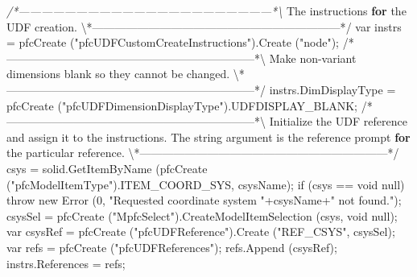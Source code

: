 \documentclass[]{article}
\newenvironment{Shaded}{}{}
\newcommand{\KeywordTok}[1]{\textcolor[rgb]{0.00,0.44,0.13}{\textbf{{#1}}}}
\newcommand{\FloatTok}[1]{\textcolor[rgb]{0.25,0.63,0.44}{{#1}}}
\newcommand{\CommentTok}[1]{\textcolor[rgb]{0.38,0.63,0.69}{\textit{{#1}}}}
\newcommand{\OtherTok}[1]{\textcolor[rgb]{0.00,0.44,0.13}{{#1}}}
\newcommand{\NormalTok}[1]{{#1}}
\begin{document}
\begin{Shaded}
\begin{Highlighting}[]
\CommentTok{/*------------------------------------------------------------------*\textbackslash{}}
  \NormalTok{The instructions }\KeywordTok{for} \NormalTok{the UDF }\OtherTok{creation}\NormalTok{.}
\NormalTok{\textbackslash{}*------------------------------------------------------------------*}\OtherTok{/  }
\OtherTok{  var instrs = }
\OtherTok{    pfcCreate }\FloatTok{(}\OtherTok{"pfcUDFCustomCreateInstructions"}\FloatTok{)}\OtherTok{.Create }\FloatTok{(}\OtherTok{"node"}\FloatTok{)}\OtherTok{;}
\OtherTok{    }
\OtherTok{/}\NormalTok{*------------------------------------------------------------------*\textbackslash{}}
  \NormalTok{Make non-variant dimensions blank so they cannot be }\OtherTok{changed}\NormalTok{.}
\NormalTok{\textbackslash{}*------------------------------------------------------------------*}\OtherTok{/  }
\OtherTok{  instrs.DimDisplayType = }
\OtherTok{    pfcCreate }\FloatTok{(}\OtherTok{"pfcUDFDimensionDisplayType"}\FloatTok{)}\OtherTok{.UDFDISPLAY_BLANK;}
\OtherTok{  }
\OtherTok{/}\NormalTok{*------------------------------------------------------------------*\textbackslash{}}
  \NormalTok{Initialize the UDF reference and assign it to the }\OtherTok{instructions}\NormalTok{.  }
  \NormalTok{The string argument is the reference prompt }\KeywordTok{for} \NormalTok{the particular }
  \OtherTok{reference}\NormalTok{.}
\NormalTok{\textbackslash{}*------------------------------------------------------------------*}\OtherTok{/       }
\OtherTok{  csys = }
\OtherTok{    solid.GetItemByName }\FloatTok{(}\OtherTok{pfcCreate }\FloatTok{(}\OtherTok{"pfcModelItemType"}\FloatTok{)}\OtherTok{.ITEM_COORD_SYS, }
\OtherTok{             csysName}\FloatTok{)}\OtherTok{;}
\OtherTok{  if }\FloatTok{(}\OtherTok{csys == void null}\FloatTok{)}
\OtherTok{    throw new Error }\FloatTok{(}\OtherTok{0, "Requested coordinate system "}\FloatTok{+}\OtherTok{csysName}\FloatTok{+}\OtherTok{" not found."}\FloatTok{)}\OtherTok{;}
\OtherTok{  csysSel = }
\OtherTok{    pfcCreate }\FloatTok{(}\OtherTok{"MpfcSelect"}\FloatTok{)}\OtherTok{.CreateModelItemSelection  }\FloatTok{(}\OtherTok{csys, void null}\FloatTok{)}\OtherTok{;}
\OtherTok{  }
\OtherTok{  var csysRef = }
\OtherTok{    pfcCreate }\FloatTok{(}\OtherTok{"pfcUDFReference"}\FloatTok{)}\OtherTok{.Create }\FloatTok{(}\OtherTok{"REF_CSYS", csysSel}\FloatTok{)}\OtherTok{;}
\OtherTok{  }
\OtherTok{  var refs = pfcCreate }\FloatTok{(}\OtherTok{"pfcUDFReferences"}\FloatTok{)}\OtherTok{;}
\OtherTok{  refs.Append }\FloatTok{(}\OtherTok{csysRef}\FloatTok{)}\OtherTok{;}
\OtherTok{  }
\OtherTok{  instrs.References = refs;}
\OtherTok{  }

\end{Highlighting}
\end{Shaded}
\end{document}
